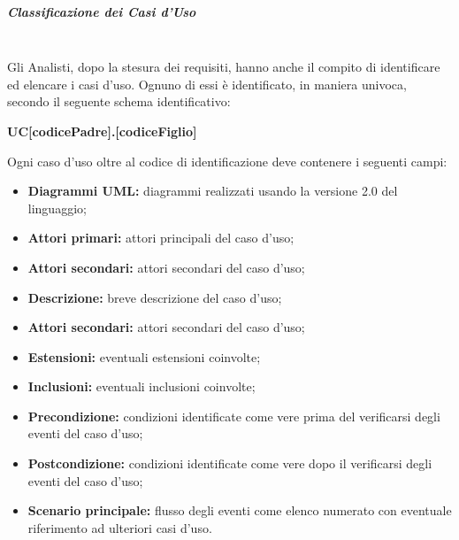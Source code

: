 				\subparagraph{Classificazione dei Casi d'Uso \\ \\}
					Gli Analisti, dopo la stesura dei requisiti, hanno anche il compito di identificare ed elencare i casi d’uso. Ognuno di essi è identificato, in maniera univoca, secondo il seguente schema identificativo:
					\begin{center}
						\textbf{UC[codicePadre].[codiceFiglio]}
					\end{center}
					Ogni caso d'uso oltre al codice di identificazione deve contenere i seguenti campi:
					\begin{itemize}
						\item \textbf{Diagrammi UML:} diagrammi realizzati usando la versione 2.0 del linguaggio;
						\item \textbf{Attori primari:} attori principali del caso d’uso; 
						\item \textbf{Attori secondari:} attori secondari del caso d’uso;
						\item \textbf{Descrizione:} breve descrizione del caso d'uso;
						\item \textbf{Attori secondari:} attori secondari del caso d’uso;
						\item \textbf{Estensioni:} eventuali estensioni coinvolte;
						\item \textbf{Inclusioni:} eventuali inclusioni coinvolte;
						\item \textbf{Precondizione:} condizioni identificate come vere prima del verificarsi degli eventi del caso d’uso;
						\item \textbf{Postcondizione:} condizioni identificate come vere dopo il verificarsi degli eventi del caso d’uso;
						\item \textbf{Scenario principale:} flusso degli eventi come elenco numerato con eventuale riferimento ad ulteriori casi d’uso.
					\end{itemize}
				
